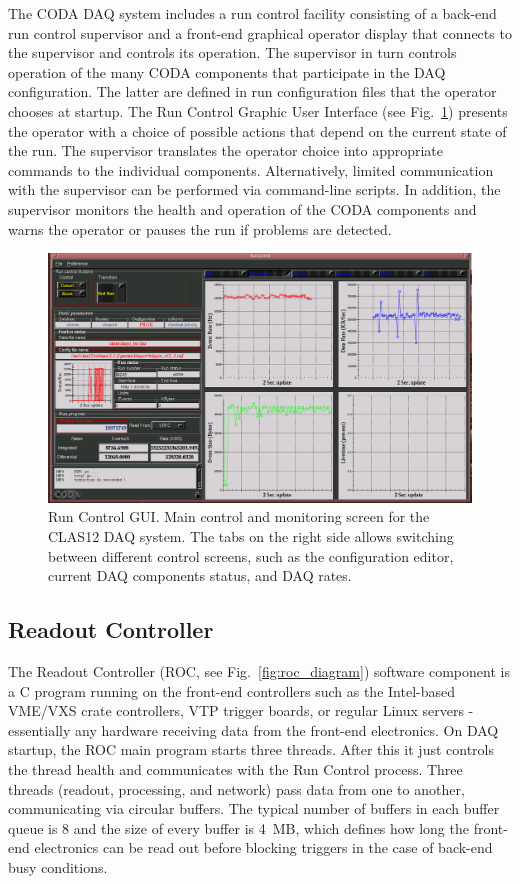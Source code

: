 The CODA DAQ system includes a run control facility consisting of a back-end run control supervisor and a front-end graphical operator display that connects to the supervisor and controls its operation. The supervisor in turn controls operation of the many CODA components that participate in the DAQ configuration. The latter are defined in run configuration files that the operator chooses at startup. The Run Control Graphic User Interface (see Fig.~\ref{fig:runcontrol1}) presents the operator with a choice of possible actions that depend on the current state of the run. The supervisor translates the operator choice into appropriate commands to the individual components. Alternatively, limited communication with the supervisor can be performed via command-line scripts. In addition, the supervisor monitors the health and operation of the CODA components and warns the operator or pauses the run if problems are detected.

\begin{figure}[hbt]
	\centering
	\includegraphics[width=1.0\columnwidth,keepaspectratio]{img/runcontrol1.png}
	\caption{Run Control GUI. Main control and monitoring screen for the CLAS12 DAQ system. The tabs on the right side allows switching between different control screens, such as the configuration editor, current DAQ components status, and DAQ rates.}
	\label{fig:runcontrol1}
\end{figure}





\subsection{Readout Controller}

The Readout Controller (ROC, see Fig.~\ref{fig:roc_diagram}) software component is a C program running on the front-end controllers such as the Intel-based VME/VXS crate controllers, VTP trigger boards, or regular Linux servers - essentially any hardware receiving data from the front-end electronics. On DAQ startup, the ROC main program starts three threads. After this it just controls the thread health and communicates with the Run Control process. Three threads (readout, processing, and network) pass data from one to another, communicating via circular buffers. The typical number of buffers in each buffer queue is 8 and the size of every buffer is 4~MB, which defines how long the front-end electronics can be read out before blocking triggers in the case of back-end busy conditions.

